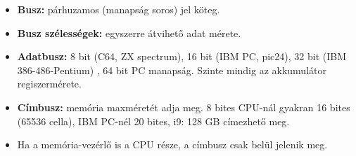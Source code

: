 \documentclass[11pt,a4paper]{article}
\begin{document}
            \begin{tcolorbox}[colback=blue!5!white,colframe=blue!50!black,title= 7. Ismertesse a számítógépes rendszer logikai felépítését!]
                \begin{center}
                \end{center}
                \begin{itemize}
                    \item \textbf{Busz:} párhuzamos (manapság soros) jel köteg.
                    \item \textbf{Busz szélességek:} egyszerre átvihető adat mérete.
                    \item \textbf{Adatbusz:} 8 bit (C64, ZX spectrum), 16 bit (IBM PC, pic24), 32 bit (IBM 386-486-Pentium) , 64 bit PC manapság. Szinte mindig az akkumulátor regiszermérete.
                    \item \textbf{Címbusz:} memória maxméretét adja meg. 8 bites CPU-nál gyakran 16 bites (65536 cella), IBM PC-nél 20 bites, i9: 128 GB címezhető meg.
                    \item Ha a memória-vezérlő is a CPU része, a címbusz csak belül jelenik meg.
                \end{itemize}
            \end{tcolorbox}
\end{document}
